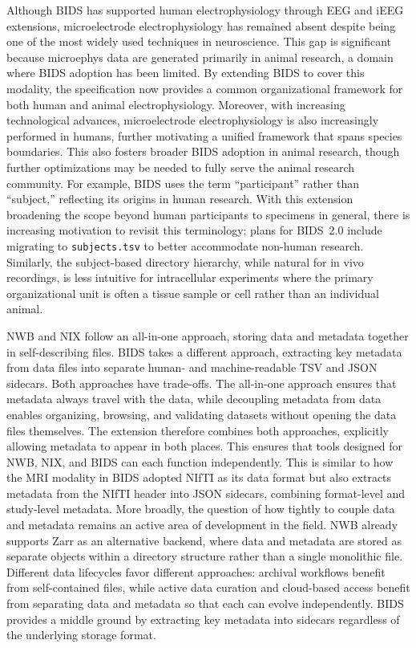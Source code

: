 \documentclass[fleqn,10pt]{article}
\begin{document}
Although BIDS has supported human electrophysiology through EEG and iEEG extensions, microelectrode electrophysiology has remained absent despite being one of the most widely used techniques in neuroscience.
This gap is significant because microephys data are generated primarily in animal research, a domain where BIDS adoption has been limited.
By extending BIDS to cover this modality, the specification now provides a common organizational framework for both human and animal electrophysiology.
Moreover, with increasing technological advances, microelectrode electrophysiology is also increasingly performed in humans, further motivating a unified framework that spans species boundaries.
This also fosters broader BIDS adoption in animal research, though further optimizations may be needed to fully serve the animal research community.
For example, BIDS uses the term ``participant'' rather than ``subject,'' reflecting its origins in human research.
With this extension broadening the scope beyond human participants to specimens in general, there is increasing motivation to revisit this terminology; plans for BIDS~2.0 include migrating to \texttt{subjects.tsv} to better accommodate non-human research.
Similarly, the subject-based directory hierarchy, while natural for in vivo recordings, is less intuitive for intracellular experiments where the primary organizational unit is often a tissue sample or cell rather than an individual animal.

NWB and NIX follow an all-in-one approach, storing data and metadata together in self-describing files.
BIDS takes a different approach, extracting key metadata from data files into separate human- and machine-readable TSV and JSON sidecars.
Both approaches have trade-offs.
The all-in-one approach ensures that metadata always travel with the data, while decoupling metadata from data enables organizing, browsing, and validating datasets without opening the data files themselves.
The extension therefore combines both approaches, explicitly allowing metadata to appear in both places. This ensures that tools designed for NWB, NIX, and BIDS can each function independently.
This is similar to how the MRI modality in BIDS adopted NIfTI as its data format but also extracts metadata from the NIfTI header into JSON sidecars, combining format-level and study-level metadata.
More broadly, the question of how tightly to couple data and metadata remains an active area of development in the field.
NWB already supports Zarr as an alternative backend, where data and metadata are stored as separate objects within a directory structure rather than a single monolithic file.
Different data lifecycles favor different approaches: archival workflows benefit from self-contained files, while active data curation and cloud-based access benefit from separating data and metadata so that each can evolve independently.
BIDS provides a middle ground by extracting key metadata into sidecars regardless of the underlying storage format.
\end{document}
